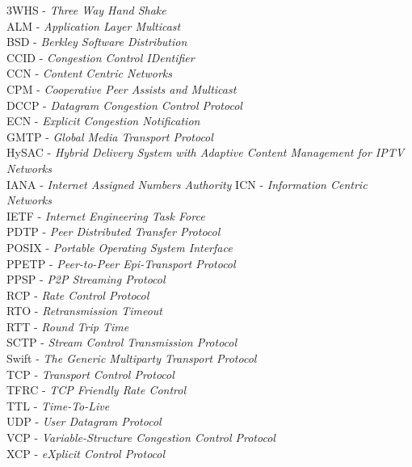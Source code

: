 3WHS		- \textit{Three Way Hand Shake}\\
ALM		- \textit{Application Layer Multicast}\\
BSD		- \textit{Berkley Software Distribution}\\
CCID		- \textit{Congestion Control IDentifier}\\
CCN		- \textit{Content Centric Networks}\\
CPM		- \textit{Cooperative Peer Assists and Multicast}\\
DCCP		- \textit{Datagram Congestion Control Protocol}\\
ECN		- \textit{Explicit Congestion Notification}\\
GMTP		- \textit{Global Media Transport Protocol}\\
HySAC		- \textit{Hybrid Delivery System with Adaptive Content Management
for IPTV Networks}\\
IANA		- \textit{Internet Assigned Numbers Authority}
ICN		- \textit{Information Centric Networks}\\
IETF		- \textit{Internet Engineering Task Force}\\
PDTP		- \textit{Peer Distributed Transfer Protocol}\\
POSIX		- \textit{Portable Operating System Interface}\\
PPETP		- \textit{Peer-to-Peer Epi-Transport Protocol}\\
PPSP		- \textit{P2P Streaming Protocol}\\
RCP		- \textit{Rate Control Protocol}\\
RTO		- \textit{Retransmission Timeout}\\
RTT		- \textit{Round Trip Time}\\
SCTP		- \textit{Stream Control Transmission Protocol}\\
Swift		- \textit{The Generic Multiparty Transport Protocol}\\
TCP		- \textit{Transport Control Protocol}\\
TFRC		- \textit{TCP Friendly Rate Control}\\
TTL		- \textit{Time-To-Live}\\
UDP		- \textit{User Datagram Protocol}\\
VCP		- \textit{Variable-Structure Congestion Control Protocol}\\
XCP		- \textit{eXplicit Control Protocol}\\